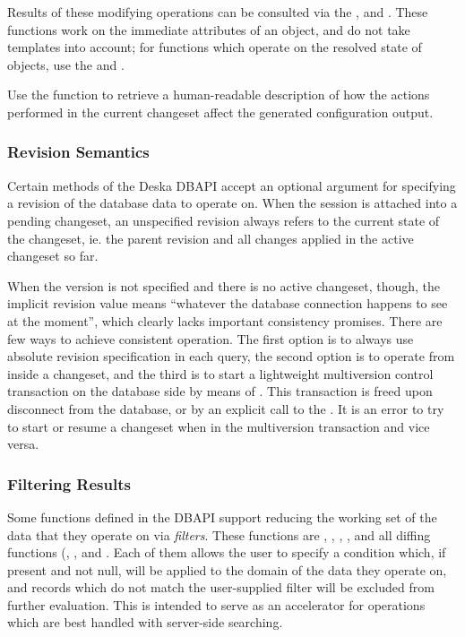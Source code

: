 \documentclass[deska]{subfiles}
\begin{document}
Results of these modifying operations can be consulted via the ,
 and .  These functions work on the
immediate attributes of an object, and do not take templates into account; for functions which operate on the resolved
state of objects, use the  and
.

Use the  function to retrieve a human-readable description of how the actions performed in
the current changeset affect the generated configuration output.

\subsubsection{Revision Semantics}
\label{sec:api-revision-semantics}

Certain methods of the Deska DBAPI accept an optional argument for specifying a revision of the database data to
operate on.  When the session is attached into a pending changeset, an unspecified revision always refers to the current
state of the changeset, ie. the parent revision and all changes applied in the active changeset so far.

When the version is not specified and there is no active changeset, though, the implicit revision value means ``whatever
the database connection happens to see at the moment'', which clearly lacks important consistency promises.  There are
few ways to achieve consistent operation.  The first option is to always use absolute revision specification in each
query,  the second option is to operate from inside a changeset, and the third is to start a lightweight multiversion
control transaction on the database side by means of .  This transaction is freed upon
disconnect from the database, or by an explicit call to the .  It is an error to try to start
or resume a changeset when in the multiversion transaction and vice versa.

\subsubsection{Filtering Results}
\label{sec:api-filters}

Some functions defined in the DBAPI support reducing the working set of the data that they operate on via {\em filters}.
These functions are , ,
, ,  and all
diffing functions (, ,
 and .  Each of them
allows the user to specify a condition which, if present and not null, will be applied to the domain of the data they
operate on, and records which do not match the user-supplied filter will be excluded from further evaluation.  This is
intended to serve as an accelerator for operations which are best handled with server-side searching.
\end{document}
